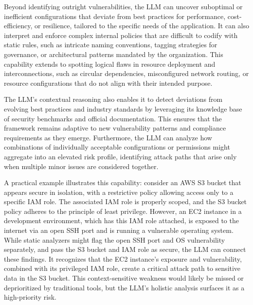 Beyond identifying outright vulnerabilities, the LLM can uncover suboptimal or inefficient configurations that deviate from best practices for performance, cost-efficiency, or resilience, tailored to the specific needs of the application\cite{andrade_enhancing_2025-1}. It can also interpret and enforce complex internal policies that are difficult to codify with static rules, such as intricate naming conventions, tagging strategies for governance, or architectural patterns mandated by the organization\cite{li_iris_2025}. This capability extends to spotting logical flaws in resource deployment and interconnections, such as circular dependencies, misconfigured network routing, or resource configurations that do not align with their intended purpose\cite{li_iris_2025, andrade_enhancing_2025-1}.

The LLM’s contextual reasoning also enables it to detect deviations from evolving best practices and industry standards by leveraging its knowledge base of security benchmarks and official documentation. This ensures that the framework remains adaptive to new vulnerability patterns and compliance requirements as they emerge\cite{li_iris_2025, andrade_enhancing_2025-1}. Furthermore, the LLM can analyze how combinations of individually acceptable configurations or permissions might aggregate into an elevated risk profile, identifying attack paths that arise only when multiple minor issues are considered together\cite{andrade_enhancing_2025-1}.

A practical example illustrates this capability: consider an AWS S3 bucket that appears secure in isolation, with a restrictive policy allowing access only to a specific IAM role. The associated IAM role is properly scoped, and the S3 bucket policy adheres to the principle of least privilege. However, an EC2 instance in a development environment, which has this IAM role attached, is exposed to the internet via an open SSH port and is running a vulnerable operating system\cite{andrade_enhancing_2025-1}. While static analyzers might flag the open SSH port and OS vulnerability separately, and pass the S3 bucket and IAM role as secure, the LLM can connect these findings. It recognizes that the EC2 instance’s exposure and vulnerability, combined with its privileged IAM role, create a critical attack path to sensitive data in the S3 bucket\cite{li_iris_2025}. This context-sensitive weakness would likely be missed or deprioritized by traditional tools, but the LLM’s holistic analysis surfaces it as a high-priority risk\cite{li_iris_2025, andrade_enhancing_2025-1}.

